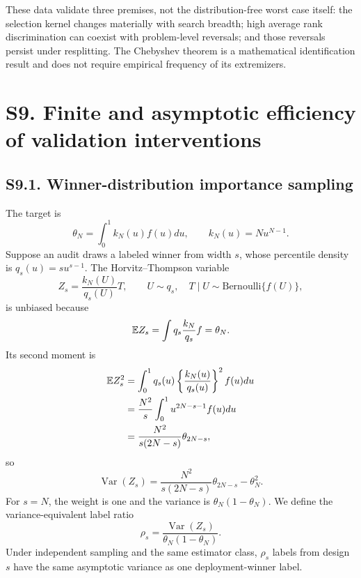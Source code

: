 These data validate three premises, not the distribution-free worst case itself: the selection kernel changes materially with search breadth; high average rank discrimination can coexist with problem-level reversals; and those reversals persist under resplitting. The Chebyshev theorem is a mathematical identification result and does not require empirical frequency of its extremizers.

\section*{S9. Finite and asymptotic efficiency of validation interventions}

\subsection*{S9.1. Winner-distribution importance sampling}

The target is
\begin{equation}
\theta_N=\int_0^1k_N(u)f(u)du,
\qquad k_N(u)=Nu^{N-1}.
\label{si:eq:eff-target}
\end{equation}
Suppose an audit draws a labeled winner from width $s$, whose percentile density is $q_s(u)=su^{s-1}$. The Horvitz--Thompson variable
\begin{equation}
Z_s=\frac{k_N(U)}{q_s(U)}T,
\qquad U\sim q_s,\quad T\mid U\sim\mathrm{Bernoulli}\{f(U)\},
\label{si:eq:HT}
\end{equation}
is unbiased because
\begin{equation}
\mathbb{E} Z_s=\int q_s\frac{k_N}{q_s}f=\theta_N.
\label{si:eq:HT-unbiased}
\end{equation}
Its second moment is
\begin{align}
\mathbb{E} Z_s^2
&=\int_0^1q_s(u)\left\{\frac{k_N(u)}{q_s(u)}\right\}^2f(u)du\nonumber\\
&=\frac{N^2}{s}\int_0^1u^{2N-s-1}f(u)du\nonumber\\
&=\frac{N^2}{s(2N-s)}\theta_{2N-s},
\label{si:eq:HT-second}
\end{align}
so
\begin{equation}
\operatorname{Var}(Z_s)
=\frac{N^2}{s(2N-s)}\theta_{2N-s}-\theta_N^2.
\label{si:eq:HT-var}
\end{equation}
For $s=N$, the weight is one and the variance is $\theta_N(1-\theta_N)$. We define the variance-equivalent label ratio
\begin{equation}
\rho_s=\frac{\operatorname{Var}(Z_s)}{\theta_N(1-\theta_N)}.
\label{si:eq:ratio}
\end{equation}
Under independent sampling and the same estimator class, $\rho_s$ labels from design $s$ have the same asymptotic variance as one deployment-winner label.


